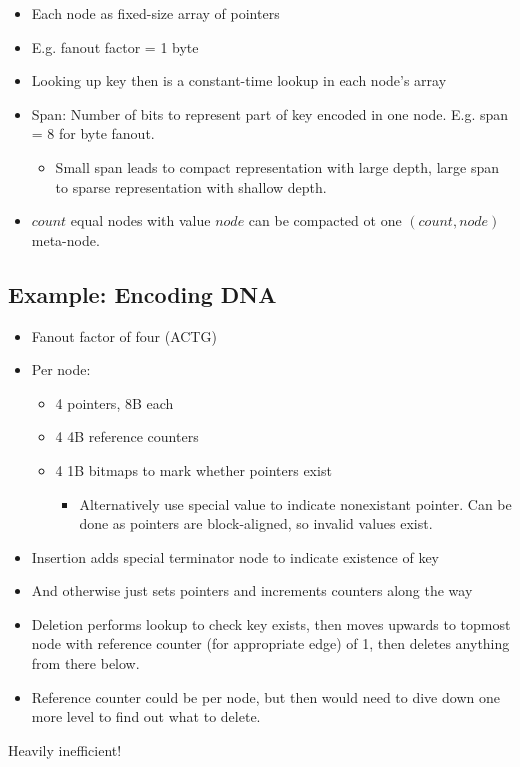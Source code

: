 \documentclass[a4paper]{scrreprt}
\begin{document}
\begin{itemize}
		\item Each node as fixed-size array of pointers
		\item E.g. fanout factor = 1 byte
		\item Looking up key then is a constant-time lookup in each node's array
		\item Span: Number of bits to represent part of key encoded in one
				node. E.g. span = 8 for byte fanout.
				\begin{itemize}
						\item Small span leads to compact representation with
								large depth, large span to sparse
								representation with shallow depth.
				\end{itemize}
		\item $count$ equal nodes with value $node$ can be compacted ot one
				$(count, node)$ meta-node.
\end{itemize}

\subsection{Example: Encoding DNA}

\begin{itemize}
		\item Fanout factor of four (ACTG)
		\item Per node:
				\begin{itemize}
						\item 4 pointers, 8B each
						\item 4 4B reference counters
						\item 4 1B bitmaps to mark whether pointers exist
								\begin{itemize}
										\item Alternatively use special value
												to indicate nonexistant
												pointer. Can be done as
												pointers are block-aligned, so
												invalid values exist.
								\end{itemize}
				\end{itemize}
		\item Insertion adds special terminator node to indicate existence of key
		\item And otherwise just sets pointers and increments counters along
				the way
		\item Deletion performs lookup to check key exists, then moves upwards
				to topmost node with reference counter (for appropriate edge)
				of 1, then deletes anything from there below.
		\item Reference counter could be per node, but then would need to dive
				down one more level to find out what to delete.
\end{itemize}

Heavily inefficient!

\printbibliography
\end{document}

